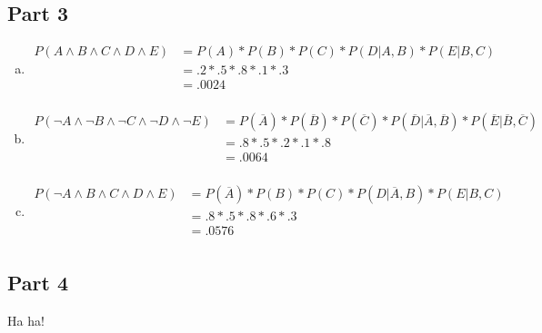 \documentclass[11pt]{article}
\begin{document}
\subsection*{Part 3}
\begin{enumerate}[a.]
\item \begin{align*}
P(A \land B \land C \land D \land E) &= P(A) * P(B) * P(C) * P(D|A,B) * P(E|B,C)\\
&= .2 * .5 * .8 * .1 * .3\\
&= .0024\\
\end{align*}
\item \begin{align*}
P(\lnot A \land \lnot B \land \lnot  C \land \lnot D \land \lnot E) &= P(\overline{A}) * P(\overline{B}) * P(\overline{C}) * P(\overline{D}|\overline{A},\overline{B}) * P(\overline{E}|\overline{B},\overline{C})\\
&= .8 * .5 * .2 * .1 * .8\\
&= .0064\\
\end{align*}
\item \begin{align*}
P(\lnot A \land B \land C \land D \land E) &= P(\overline{A}) * P(B) * P(C) * P(D|\overline{A},B) * P(E|B,C)\\
&= .8 * .5 * .8 * .6 * .3\\
&= .0576\\
\end{align*}
\end{enumerate}
\subsection*{Part 4}
Ha ha!
\end{document}
